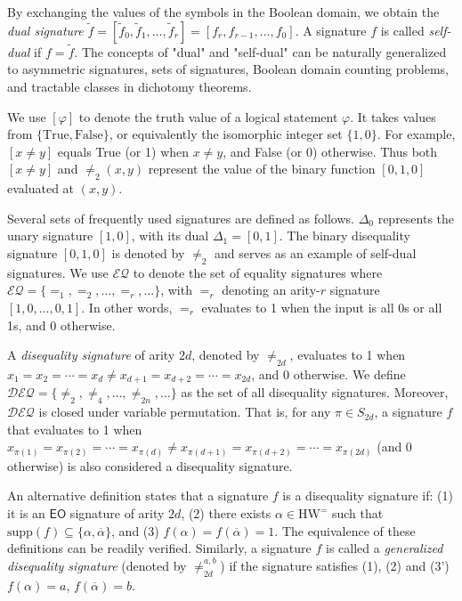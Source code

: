 \documentclass[a4paper,UKenglish,cleveref, autoref, thm-restate]{lipics-v2021}
\newcommand{\eo}[0]{\textsf{EO}}
\newcommand{\eoe}[0]{\text{HW}^=}
\newcommand{\su}[0]{\text{supp}}
\begin{document}
By exchanging the values of the symbols in the Boolean domain, we obtain the \textit{dual signature} $\widetilde f=[\widetilde f_0, \widetilde f_1, \ldots, \widetilde f_r]=[f_r, f_{r-1}, \ldots, f_0]$. A signature $f$ is called \textit{self-dual} if $f=\widetilde f$. The concepts of "dual" and "self-dual" can be naturally generalized to asymmetric signatures, sets of signatures, Boolean domain counting problems, and tractable classes in dichotomy theorems.

We use $[\varphi]$ to denote the truth value of a logical statement $\varphi$. It takes values from $\{\text{True}, \text{False}\}$, or equivalently the isomorphic integer set $\{1,0\}$.
For example, $[x \neq y]$ equals True (or 1) when $x\neq y$, and False (or 0) otherwise. Thus both $[x\neq y]$ and $\neq_2(x,y)$ represent the value of the binary function $[0,1,0]$ evaluated at $(x,y)$.

Several sets of frequently used signatures are defined as follows. $\Delta_0$ represents the unary signature $[1,0]$, with its dual $\Delta_1=[0,1]$. The binary disequality signature $[0,1,0]$ is denoted by $\neq_2$ and serves as an example of self-dual signatures. We use $\mathcal{EQ}$ to denote the set of equality signatures where $\mathcal{EQ}=\{=_1,=_2,\ldots,=_r,\ldots\}$, with $=_r$ denoting an arity-$r$ signature $[1,0,\ldots,0,1]$. In other words, $=_r$ evaluates to 1 when the input is all 0s or all 1s, and 0 otherwise.

A \textit{disequality signature} of arity $2d$, denoted by $\neq_{2d}$, evaluates to 1 when $x_1=x_2=\cdots=x_d\neq x_{d+1}=x_{d+2}=\cdots=x_{2d}$, and 0 otherwise. We define $\mathcal{DEQ}=\{\neq_2,\neq_4,\ldots,\neq_{2n},\ldots\}$ as the set of all disequality signatures. Moreover, $\mathcal{DEQ}$ is closed under variable permutation. That is, for any $\pi\in S_{2d}$, a signature $f$ that evaluates to 1 when $x_{\pi(1)}=x_{\pi(2)}=\cdots=x_{\pi(d)}\neq x_{\pi(d+1)}=x_{\pi(d+2)}=\cdots=x_{\pi(2d)}$ (and 0 otherwise) is also considered a disequality signature.

An alternative definition states that a signature $f$ is a disequality signature if: (1) it is an $\eo$ signature of arity $2d$, (2) there exists $\alpha\in\eoe$ such that $\su(f)\subseteq\{\alpha,\overline\alpha\}$, and (3) $f(\alpha)=f(\overline\alpha)=1$. The equivalence of these definitions can be readily verified.
Similarly, a signature $f$ is called a \textit{generalized disequality signature} (denoted by $\neq_{2d}^{a,b}$) if the signature satisfies (1), (2) and (3') $f(\alpha)=a$, $f(\overline\alpha)=b$.
\end{document}
